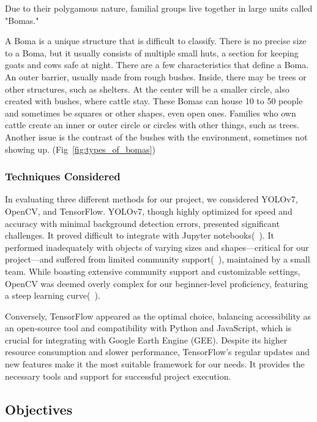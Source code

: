 \documentclass[10pt]{article}
\begin{document}
Due to their polygamous nature, familial groups live together in large units called "Bomas." 

A Boma is a unique structure that is difficult to classify. There is no precise size to a Boma, but it usually consists of multiple small huts, a section for keeping goats and cows safe at night. There are a few characteristics that define a Boma. An outer barrier, usually made from rough bushes. Inside, there may be trees or other structures, such as shelters. At the center will be a smaller circle, also created with bushes, where cattle stay. These Bomas can house 10 to 50 people and sometimes be squares or other shapes, even open ones. Families who own cattle create an inner or outer circle or circles with other things, such as trees. Another issue is the contrast of the bushes with the environment, sometimes not showing up. (Fig~\ref{fig:types_of_bomas})


\subsubsection{Techniques Considered}

In evaluating three different methods for our project, we considered YOLOv7, OpenCV, and TensorFlow. YOLOv7, though highly optimized for speed and accuracy with minimal background detection errors, presented significant challenges. It proved difficult to integrate with Jupyter notebooks(~\autocite{s23135849}). It performed inadequately with objects of varying sizes and shapes—critical for our project—and suffered from limited community support(~\autocite{IJERTV10IS060287}), maintained by a small team. While boasting extensive community support and customizable settings, OpenCV was deemed overly complex for our beginner-level proficiency, featuring a steep learning curve(~\autocite{9174593}).

Conversely, TensorFlow appeared as the optimal choice, balancing accessibility as an open-source tool and compatibility with Python and JavaScript, which is crucial for integrating with Google Earth Engine (GEE).
Despite its higher resource consumption and slower performance, TensorFlow's regular updates and new features make it the most suitable framework for our needs. It provides the necessary tools and support for successful project execution.

\subsection{Objectives}
\end{document}
